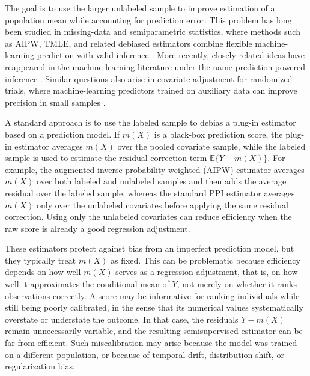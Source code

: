 \documentclass{article}
\theoremstyle{plain}
\theoremstyle{definition}
\newcommand{\E}{\mathbb{E}}
\newcommand{\1}{\mathbbm{1}}
\begin{document}
The goal is to use the larger unlabeled sample to improve estimation of a population mean while accounting for prediction error. This problem has long been studied in missing-data and semiparametric statistics, where methods such as AIPW, TMLE, and related debiased estimators combine flexible machine-learning prediction with valid inference \citep{robins1994estimation,vanderlaanunified,van2006targeted,vanderLaanRose2011,DoubleML}. More recently, closely related ideas have reappeared in the machine-learning literature under the name prediction-powered inference \citep{ppi2023,angelopoulos2023ppi,crossppi2024}. Similar questions also arise in covariate adjustment for randomized trials, where machine-learning predictors trained on auxiliary data can improve precision in small samples \citep{hansen2008prognostic,rubin2008empirical,moore2009covariate,lin2013agnostic,benkeser2021improving,schuler2022increasing,demirel2024prediction,jin2026prognostic}.

A standard approach is to use the labeled sample to debias a plug-in estimator based on a prediction model. If \(m(X)\) is a black-box prediction score, the plug-in estimator averages \(m(X)\) over the pooled covariate sample, while the labeled sample is used to estimate the residual correction term \(\E\{Y-m(X)\}\). For example, the augmented inverse-probability weighted (AIPW) estimator \citep{robins1994estimation} averages \(m(X)\) over both labeled and unlabeled samples and then adds the average residual over the labeled sample, whereas the standard PPI estimator \citep{ppi2023} averages \(m(X)\) only over the unlabeled covariates before applying the same residual correction. Using only the unlabeled covariates can reduce efficiency when the raw score is already a good regression adjustment.

These estimators protect against bias from an imperfect prediction model, but they typically treat \(m(X)\) as fixed. This can be problematic because efficiency depends on how well \(m(X)\) serves as a regression adjustment, that is, on how well it approximates the conditional mean of \(Y\), not merely on whether it ranks observations correctly. A score may be informative for ranking individuals while still being poorly calibrated, in the sense that its numerical values systematically overstate or understate the outcome. In that case, the residuals \(Y-m(X)\) remain unnecessarily variable, and the resulting semisupervised estimator can be far from efficient. Such miscalibration may arise because the model was trained on a different population, or because of temporal drift, distribution shift, or regularization bias.
\end{document}
